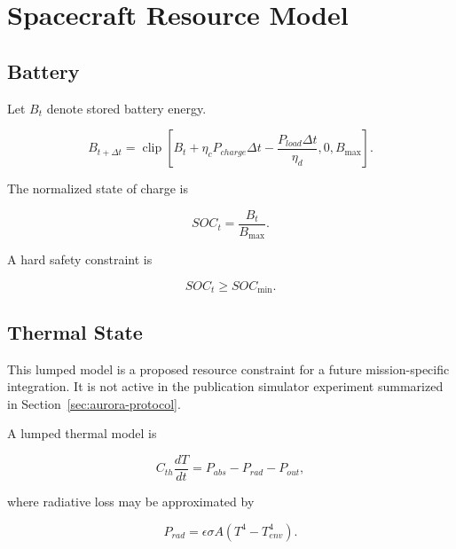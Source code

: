 \documentclass[11pt,a4paper]{article}
\begin{document}

\section{Spacecraft Resource Model}

\subsection{Battery}

Let $B_t$ denote stored battery energy.

\begin{equation}
B_{t+\Delta t}
=
\operatorname{clip}
\left[
B_t
+
\eta_cP_{charge}\Delta t
-
\frac{P_{load}\Delta t}{\eta_d},
0,
B_{\max}
\right].
\end{equation}

The normalized state of charge is

\begin{equation}
SOC_t
=
\frac{B_t}{B_{\max}}.
\end{equation}

A hard safety constraint is

\begin{equation}
SOC_t
\geq
SOC_{\min}.
\end{equation}


\subsection{Thermal State}

This lumped model is a proposed resource constraint for a future
mission-specific integration. It is not active in the publication
simulator experiment summarized in Section~\ref{sec:aurora-protocol}.

A lumped thermal model is

\begin{equation}
C_{th}
\frac{dT}{dt}
=
P_{abs}
-
P_{rad}
-
P_{out},
\end{equation}

where radiative loss may be approximated by

\begin{equation}
P_{rad}
=
\epsilon\sigma A
\left(
T^4-T_{env}^4
\right).
\end{equation}
\end{document}

